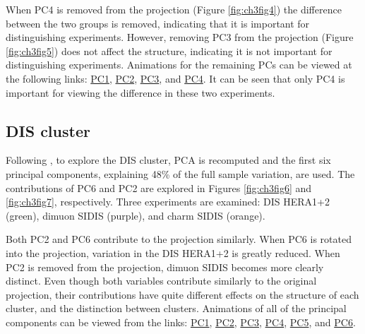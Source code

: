 \documentclass{template/monashthesis}
\begin{document}
When PC4 is removed from the projection (Figure \ref{fig:ch3fig4}) the difference between the two groups is removed, indicating that it is important for distinguishing experiments. However, removing PC3 from the projection (Figure \ref{fig:ch3fig5}) does not affect the structure, indicating it is not important for distinguishing experiments. Animations for the remaining PCs can be viewed at the following links: \href{https://github.com/nspyrison/spinifex_paper/blob/master/paper/gifs/jetcluster_manualtour_pc1.gif}{PC1}, \href{https://github.com/nspyrison/spinifex_paper/blob/master/paper/gifs/jetcluster_manualtour_pc2.gif}{PC2}, \href{https://github.com/nspyrison/spinifex_paper/blob/master/paper/gifs/jetcluster_manualtour_pc3.gif}{PC3}, and \href{https://github.com/nspyrison/spinifex_paper/blob/master/paper/gifs/jetcluster_manualtour_pc4.gif}{PC4}. It can be seen that only PC4 is important for viewing the difference in these two experiments.

\hypertarget{dis-cluster}{%
\subsection{DIS cluster}\label{dis-cluster}}

Following \textcite{cook_dynamical_2018}, to explore the DIS cluster, PCA is recomputed and the first six principal components, explaining 48\% of the full sample variation, are used. The contributions of PC6 and PC2 are explored in Figures \ref{fig:ch3fig6} and \ref{fig:ch3fig7}, respectively. Three experiments are examined: DIS HERA1+2 (green), dimuon SIDIS (purple), and charm SIDIS (orange).

Both PC2 and PC6 contribute to the projection similarly. When PC6 is rotated into the projection, variation in the DIS HERA1+2 is greatly reduced. When PC2 is removed from the projection, dimuon SIDIS becomes more clearly distinct. Even though both variables contribute similarly to the original projection, their contributions have quite different effects on the structure of each cluster, and the distinction between clusters. Animations of all of the principal components can be viewed from the links: \href{https://github.com/nspyrison/spinifex_paper/blob/master/paper/gifs/discluster_manualtour_pc1.gif}{PC1}, \href{https://github.com/nspyrison/spinifex_paper/blob/master/paper/gifs/discluster_manualtour_pc2.gif}{PC2}, \href{https://github.com/nspyrison/spinifex_paper/blob/master/paper/gifs/discluster_manualtour_pc3.gif}{PC3}, \href{https://github.com/nspyrison/spinifex_paper/blob/master/paper/gifs/discluster_manualtour_pc4.gif}{PC4}, \href{https://github.com/nspyrison/spinifex_paper/blob/master/paper/gifs/discluster_manualtour_pc5.gif}{PC5}, and \href{https://github.com/nspyrison/spinifex_paper/blob/master/paper/gifs/discluster_manualtour_pc6.gif}{PC6}.
\end{document}
